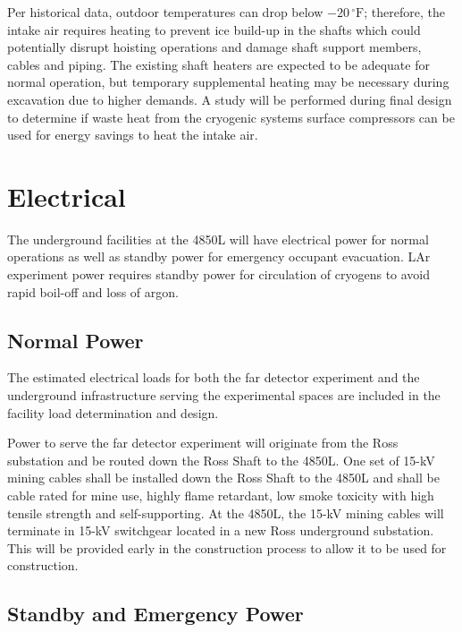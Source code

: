 Per historical data, outdoor temperatures can drop below $-20\,^{\circ}\mathrm{F}$; therefore, the intake air requires heating to prevent ice build-up in the shafts which could potentially disrupt hoisting operations and damage shaft support members, cables and piping. The existing shaft heaters are expected to be adequate for normal operation, but temporary supplemental heating may be necessary during excavation due to higher demands.  A study will be performed during final design to determine if waste heat from the cryogenic systems surface compressors can be used for energy savings to heat the intake air.

\section{Electrical}
\label{sec:fscf-und-elec}

The underground facilities at the 4850L will have electrical power for normal operations as well as standby power for emergency occupant evacuation. LAr experiment power requires standby power for circulation of cryogens to avoid rapid boil-off and loss of argon.

\subsection{Normal Power}
\label{sec:fscf-und-norm-pwr}

The estimated electrical loads for both the far detector experiment and the underground infrastructure serving the experimental spaces are included in the facility load determination and design. 

Power to serve the far detector experiment will originate from the Ross substation and be routed down the Ross Shaft to the 4850L. One set of 15-kV mining cables shall be installed down the Ross Shaft to the 4850L and shall be cable rated for mine use, highly flame retardant, low smoke toxicity with high tensile strength and self-supporting. At the 4850L, the 15-kV mining cables will terminate in 15-kV switchgear located in a new Ross underground substation. This will be provided early in the construction process to allow it to be used for construction.

\subsection{Standby and Emergency Power}
\label{sec:fscf-und-emerg-pwr}

